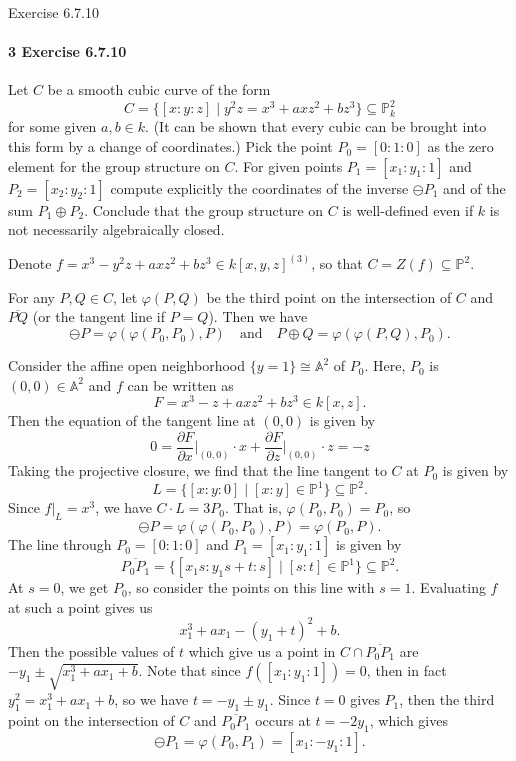 \documentclass[12pt]{article}
\newlength{\myparskip}
\newenvironment{fullbox}{\begin{lrbox}{\savefullbox}\begin{minipage}{\dimexpr\textwidth-2\fboxsep\relax}\setlength{\parskip}{\myparskip}}{\end{minipage}\end{lrbox}\framebox[\textwidth]{\usebox{\savefullbox}}}
\newenvironment{pbox}[1][]{\begin{fullbox}\ifx#1\empty\else\paragraph{#1}\phantom{}\fi}{\end{fullbox}}
\theoremstyle{definition}
\newcommand{\isp}[1]{\quad\text{#1}\quad}
\newcommand{\A}{\mathbb{A}}
\renewcommand{\P}{\mathbb{P}}
\renewcommand{\phi}{\varphi}
\newcommand{\<}{\langle}
\renewcommand{\>}{\rangle}
\newcommand{\isom}{\cong}
\newcommand{\seq}{\subseteq}
\begin{document}
\newpage
\begin{pbox}[3 Exercise 6.7.10]
    Let $C$ be a smooth cubic curve of the form
    \[
        C = \{[x : y : z] \mid y^2z = x^3 + axz^2 + bz^3\} \seq \P_k^2
    \]
    for some given $a, b \in k$.
    (It can be shown that every cubic can be brought into this form by a change of coordinates.)
    Pick the point $P_0 = [0 : 1 : 0]$ as the zero element for the group structure on $C$.
    For given points $P_1 = [x_1 : y_1 : 1]$ and $P_2 = [x_2 : y_2 : 1]$ compute explicitly the coordinates of the inverse $\ominus P_1$ and of the sum $P_1 \oplus P_2$.
    Conclude that the group structure on $C$ is well-defined even if $k$ is not necessarily algebraically closed.
\end{pbox}

Denote $f = x^3 - y^2z + axz^2 + bz^3 \in k[x, y, z]^{(3)}$, so that $C = Z(f) \seq \P^2$.

For any $P, Q \in C$, let $\phi(P, Q)$ be the third point on the intersection of $C$ and $\overline{PQ}$ (or the tangent line if $P = Q$).
Then we have
\[
    \ominus P = \phi(\phi(P_0, P_0), P) \isp{and} P \oplus Q = \phi(\phi(P, Q), P_0).
\]

Consider the affine open neighborhood $\{y = 1\} \isom \A^2$ of $P_0$.
Here, $P_0$ is $(0, 0) \in \A^2$ and $f$ can be written as 
\[
    F = x^3 -z + axz^2 + bz^3 \in k[x, z].
\]
Then the equation of the tangent line at $(0, 0)$ is given by
\[\textstyle
    0
        = \frac{\partial F}{\partial x}\big|_{(0, 0)} \cdot x + \frac{\partial F}{\partial z}\big|_{(0, 0)} \cdot z
        = -z
\]
Taking the projective closure, we find that the line tangent to $C$ at $P_0$ is given by
\[
    L = \{[x : y : 0] \mid [x : y] \in \P^1\} \seq \P^2.
\]
Since $f|_L = x^3$, we have $C \cdot L = 3P_0$.
That is, $\phi(P_0, P_0) = P_0$, so
\[
    \ominus P = \phi(\phi(P_0, P_0), P) = \phi(P_0, P).
\]
The line through $P_0 = [0 : 1 : 0]$ and $P_1 = [x_1 : y_1 : 1]$ is given by
\[
    \overline{P_0P_1} = \{[x_1s : y_1s + t : s] \mid [s : t] \in \P^1\} \seq \P^2.
\]
At $s = 0$, we get $P_0$, so consider the points on this line with $s = 1$.
Evaluating $f$ at such a point gives us
\[
    x_1^3 + ax_1 - (y_1 + t)^2 + b.
\]
Then the possible values of $t$ which give us a point in $C \cap \overline{P_0P_1}$ are $-y_1 \pm \sqrt{x_1^3 + ax_1 + b}$.
Note that since $f([x_1 : y_1 : 1]) = 0$, then in fact $y_1^2 = x_1^3 + ax_1 + b$, so we have $t = -y_1 \pm y_1$.
Since $t = 0$ gives $P_1$, then the third point on the intersection of $C$ and $\overline{P_0P_1}$ occurs at $t = -2y_1$, which gives
\[
    \ominus P_1 = \phi(P_0, P_1) = [x_1 : -y_1 : 1].
\]
\end{document}
